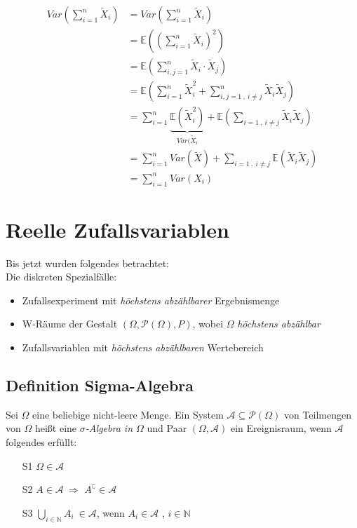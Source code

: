 \documentclass[12pt,a4paper]{article}
\begin{document}
	\begin{align*}
	Var\left(\sum_{i=1}^n \tilde{X}_i\right) &= Var\left(\sum_{i=1}^n \tilde{X}_i\right)\\
	&= \mathbb{E}\left(\left(\sum_{i=1}^n \tilde{X}_i \right)^2 \right)\\
	&= \mathbb{E}\left(\sum_{i,j=1}^n \tilde{X}_i \cdot \tilde{X}_j\right)\\
	&= \mathbb{E}\left(\sum_{i=1}^n \tilde{X}_i^2 + \sum_{i,j=1\: , \: i\neq j}^n  \tilde{X}_i \tilde{X}_j\right)\\
	&= \sum_{i=1}^n \underbrace{\mathbb{E}\left(\tilde{X}_i^2\right)}_{Var(\tilde{X}_i} + \mathbb{E}\left(\sum_{i=1\: , \: i\neq j} \tilde{X}_i \tilde{X}_j\right)\\
	&= \sum_{i=1}^n Var(\tilde{X}) + \sum_{i=1\: , \: i\neq j}\mathbb{E}\left(\tilde{X}_i \tilde{X}_j\right)\\
	&= \sum_{i=1}^n Var(X_i) 
	\end{align*}
	 
	\section{Reelle Zufallsvariablen}
	Bis jetzt wurden folgendes betrachtet:\\
	Die diskreten Spezialfälle:
	\begin{itemize}
		\item Zufallsexperiment mit \emph{höchstens abzählbarer} Ergebnismenge
		\item W-Räume der Gestalt $(\Omega, \mathcal{P}(\Omega),P)$, wobei $\Omega$ \emph{höchstens abzählbar}
		\item Zufallsvariablen mit \emph{höchstens abzählbaren} Wertebereich
	\end{itemize}
	
	\subsection{Definition Sigma-Algebra}
	Sei $\Omega$ eine beliebige nicht-leere Menge. Ein System $\mathcal{A}\subseteq\mathcal{P}(\Omega)$ von Teilmengen von $\Omega$ heißt eine \textit{$\sigma$-Algebra in $\Omega$} und Paar $(\Omega,\mathcal{A})$ ein Ereignisraum, wenn $\mathcal{A}$ folgendes erfüllt:
	\begin{itemize}
		\item[S1] $\Omega\in\mathcal{A}$
		\item[S2] $A\in\mathcal{A}\: \Rightarrow$ $A^\complement \in \mathcal{A}$
		\item[S3] $\displaystyle \bigcup_{i\in\mathbb{N}} A_i \: \in\mathcal{A}$, wenn $A_i\in\mathcal{A}$ , $i\in\mathbb{N}$ 
	\end{itemize}
	
\end{document}
